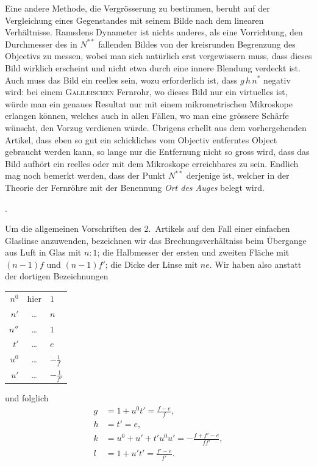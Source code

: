 \documentclass[11pt,a4paper]{article}
\begin{document}
Eine andere Methode, die Vergrösserung zu bestimmen, beruht auf der Vergleichung eines Gegenstandes mit seinem Bilde nach dem linearen Verhältnisse. Ramsdens Dynameter ist nichts anderes, als eine Vorrichtung, den Durchmesser des in $N^{**}$ fallenden Bildes von der kreisrunden Begrenzung des Objectivs zu messen, wobei man sich natürlich erst vergewissern muss, dass dieses Bild wirklich erscheint und nicht etwa durch eine innere Blendung verdeckt ist. Auch muss das Bild ein reelles sein, wozu erforderlich ist, dass $g\,h\,n^*$ negativ wird: bei einem \textsc{Galileischen} Fernrohr, wo dieses Bild nur ein virtuelles ist, würde man ein genaues Resultat nur mit einem mikrometrischen Mikroskope erlangen können, welches auch in allen Fällen, wo man eine grössere Schärfe wünscht, den Vorzug verdienen würde. Übrigens erhellt aus dem vorhergehenden Artikel, dass eben so gut ein schickliches vom Objectiv entferntes Object gebraucht werden kann, so lange nur die Entfernung nicht so gross wird, dass das Bild aufhört ein reelles oder mit dem Mikroskope erreichbares zu sein. Endlich mag noch bemerkt werden, dass der Punkt $N^{**}$ derjenige ist, welcher in der Theorie der Fernröhre mit der Benennung \textit{Ort des Auges} belegt wird.

\newpage
{}.

\smallskip
Um die allgemeinen Vorschriften des 2.~Artikels auf den Fall einer einfachen Glaslinse anzuwenden, bezeichnen wir das Brechungsverhältniss beim Übergange aus Luft in Glas mit $n : 1$; die Halbmesser der ersten und zweiten Fläche mit $(n-1)f$ und $(n-1)f'$; die Dicke der Linse mit $ne$. Wir haben also anstatt der dortigen Bezeichnungen

\begin{center}
\begin{tabular}{rcl}
$n^0$ & hier & $1$ \\
$n'$ & \ldots & $n$ \\
$n''$ & \ldots & $1$ \\
$t'$ & \ldots & $e$ \\
$u^0$ & \ldots & $-\frac{1}{f}$ \\
$u'$ & \ldots & $-\frac{1}{f'}$
\end{tabular}
\end{center}

und folglich
\begin{align*}
g &= 1 + u^0 t' = \tfrac{f - e}{f}, \\
h &= t' = e, \\
k &= u^0 + u' + t' u^0 u' = -\tfrac{f + f' - e}{ff'}, \\
l &= 1 + u' t' = \tfrac{f' - e}{f'}.
\end{align*}
\end{document}
